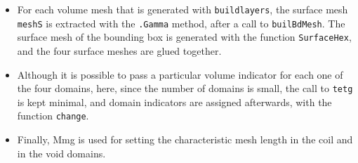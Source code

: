 \documentclass[9pt]{amsart}
\theoremstyle{remark}
\theoremstyle{definition}
\begin{document}
\begin{itemize}
\item For each volume mesh that is generated with \verb!buildlayers!, the surface mesh \verb!meshS! is extracted with the \verb!.Gamma! method, after a call to \verb!builBdMesh!. The surface mesh of the bounding box is generated with the function \verb!SurfaceHex!, and the four surface meshes are glued together.
\item Although it is possible to pass a particular volume indicator for each one of the four domains, here, since the number of domains is small, the call to \verb!tetg! is kept minimal, and domain indicators are assigned afterwards, with the function \verb!change!.
\item Finally, Mmg is used for setting the characteristic mesh length in the coil and in the void domains.
\end{itemize}
\end{document}
